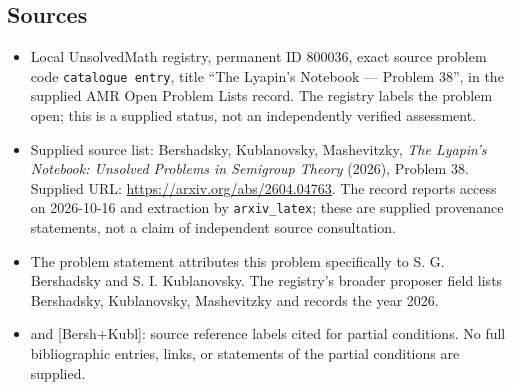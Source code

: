 \documentclass[11pt]{article}
\begin{document}
\subsection{Sources}
\begin{itemize}
\item Local UnsolvedMath registry, permanent ID \(800036\), exact source problem code \texttt{catalogue entry}, title ``The Lyapin's Notebook --- Problem 38'', in the supplied AMR Open Problem Lists record. The registry labels the problem open; this is a supplied status, not an independently verified assessment.
\item Supplied source list: Bershadsky, Kublanovsky, Mashevitzky, \emph{The Lyapin's Notebook: Unsolved Problems in Semigroup Theory} (2026), Problem 38. Supplied URL: \url{https://arxiv.org/abs/2604.04763}. The record reports access on 2026-10-16 and extraction by \texttt{arxiv\_latex}; these are supplied provenance statements, not a claim of independent source consultation.
\item The problem statement attributes this problem specifically to S. G. Bershadsky and S. I. Kublanovsky. The registry's broader proposer field lists Bershadsky, Kublanovsky, Mashevitzky and records the year 2026.
\item [Donald] and [Bersh+Kubl]: source reference labels cited for partial conditions. No full bibliographic entries, links, or statements of the partial conditions are supplied.
\end{itemize}
\end{document}
